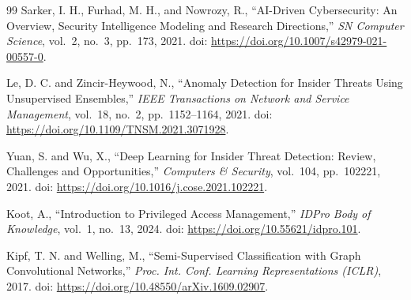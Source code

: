 \documentclass[11pt,a4paper,oneside]{report}
\theoremstyle{definition}
\theoremstyle{plain}
\begin{document}
\begin{thebibliography}{99}
Sarker, I. H., Furhad, M. H., and Nowrozy, R., ``{AI}-Driven Cybersecurity: An Overview, Security Intelligence Modeling and Research Directions,'' \emph{SN Computer Science}, vol.~2, no.~3, pp.~173, 2021. doi: \url{https://doi.org/10.1007/s42979-021-00557-0}.

Le, D. C. and Zincir-Heywood, N., ``Anomaly Detection for Insider Threats Using Unsupervised Ensembles,'' \emph{IEEE Transactions on Network and Service Management}, vol.~18, no.~2, pp.~1152--1164, 2021. doi: \url{https://doi.org/10.1109/TNSM.2021.3071928}.

Yuan, S. and Wu, X., ``Deep Learning for Insider Threat Detection: Review, Challenges and Opportunities,'' \emph{Computers \& Security}, vol.~104, pp.~102221, 2021. doi: \url{https://doi.org/10.1016/j.cose.2021.102221}.

Koot, A., ``Introduction to Privileged Access Management,'' \emph{IDPro Body of Knowledge}, vol.~1, no.~13, 2024. doi: \url{https://doi.org/10.55621/idpro.101}.

Kipf, T. N. and Welling, M., ``Semi-Supervised Classification with Graph Convolutional Networks,'' \emph{Proc. Int. Conf. Learning Representations ({ICLR})}, 2017. doi: \url{https://doi.org/10.48550/arXiv.1609.02907}.

\end{thebibliography}
\end{document}
